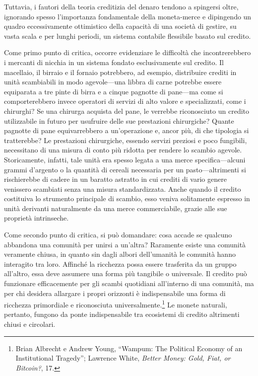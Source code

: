\documentclass[
  a5paper,
  smalldemyvopaper,10pt,twoside,onecolumn,openright,extrafontsizes,hidelinks]{memoir}
\begin{document}
Tuttavia, i fautori della teoria creditizia del denaro tendono a
spingersi oltre, ignorando spesso l'importanza fondamentale della
moneta-merce e dipingendo un quadro eccessivamente ottimistico della
capacità di una società di gestire, su vasta scala e per lunghi periodi,
un sistema contabile flessibile basato sul credito.

Come primo punto di critica, occorre evidenziare le difficoltà che
incontrerebbero i mercanti di nicchia in un sistema fondato
esclusivamente sul credito. Il macellaio, il birraio e il fornaio
potrebbero, ad esempio, distribuire crediti in unità scambiabili in modo
agevole---una libbra di carne potrebbe essere equiparata a tre pinte di
birra e a cinque pagnotte di pane---ma come si comporterebbero invece
operatori di servizi di alto valore e specializzati, come i chirurghi?
Se una chirurga acquista del pane, le verrebbe riconosciuto un credito
utilizzabile in futuro per usufruire delle sue prestazioni chirurgiche?
Quante pagnotte di pane equivarrebbero a un'operazione e, ancor più, di
che tipologia si tratterebbe? Le prestazioni chirurgiche, essendo
servizi preziosi e poco fungibili, necessitano di una misura di conto
più ridotta per rendere lo scambio agevole. Storicamente, infatti, tale
unità era spesso legata a una merce specifica---alcuni grammi d'argento
o la quantità di cereali necessaria per un pasto---altrimenti si
rischierebbe di cadere in un baratto astratto in cui crediti di vario
genere venissero scambiati senza una misura standardizzata. Anche quando
il credito costituiva lo strumento principale di scambio, esso veniva
solitamente espresso in unità derivanti naturalmente da una merce
commerciabile, grazie alle sue proprietà intrinseche.

Come secondo punto di critica, si può domandare: cosa accade se qualcuno
abbandona una comunità per unirsi a un'altra? Raramente esiste una
comunità veramente chiusa, in quanto sin dagli albori dell'umanità le
comunità hanno interagito tra loro. Affinché la ricchezza possa essere
trasferita da un gruppo all'altro, essa deve assumere una forma più
tangibile o universale. Il credito può funzionare efficacemente per gli
scambi quotidiani all'interno di una comunità, ma per chi desidera
allargare i propri orizzonti è indispensabile una forma di ricchezza
primordiale e riconosciuta universalmente.\footnote{Brian Albrecht e
  Andrew Young, ``Wampum: The Political Economy of an Institutional
  Tragedy''; Lawrence White, \emph{Better Money: Gold, Fiat, or
  Bitcoin?}, 17.} Le monete naturali, pertanto, fungono da ponte
indispensabile tra ecosistemi di credito altrimenti chiusi e circolari.
\end{document}
